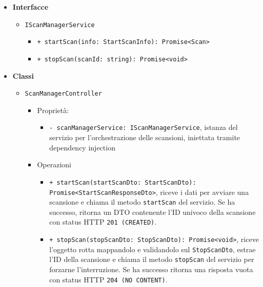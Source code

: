 \documentclass[a4paper, 11pt]{article}
\begin{document}
\begin{itemize}
  \item \textbf{Interfacce}
    \begin{itemize}
      \item \texttt{IScanManagerService}
        \begin{itemize}
          \item \texttt{+ startScan(info: StartScanInfo): Promise<Scan>}
          \item \texttt{+ stopScan(scanId: string): Promise<void>}
        \end{itemize}
    \end{itemize}
  \item \textbf{Classi}
    \begin{itemize}
      \item \texttt{ScanManagerController}
        \begin{itemize}
          \item Proprietà:
            \begin{itemize}
              \item \texttt{- scanManagerService: IScanManagerService}, istanza del servizio per l'orchestrazione delle scansioni, iniettata tramite dependency injection
            \end{itemize}
          \item Operazioni
            \begin{itemize}
              \item \texttt{+ startScan(startScanDto: StartScanDto): Promise<StartScanResponseDto>}, riceve i dati per avviare una scansione e chiama il metodo \texttt{startScan} del servizio. Se ha successo, ritorna un DTO contenente l'ID univoco della scansione con status HTTP \texttt{201 (CREATED)}.
              \item \texttt{+ stopScan(stopScanDto: StopScanDto): Promise<void>}, riceve l'oggetto rotta mappandolo e validandolo sul \texttt{StopScanDto}, estrae l'ID della scansione e chiama il metodo \texttt{stopScan} del servizio per forzarne l'interruzione. Se ha successo ritorna una risposta vuota con status HTTP \texttt{204 (NO CONTENT)}.
            \end{itemize}
        \end{itemize}
      

\end{itemize}
\end{itemize}
\end{document}
